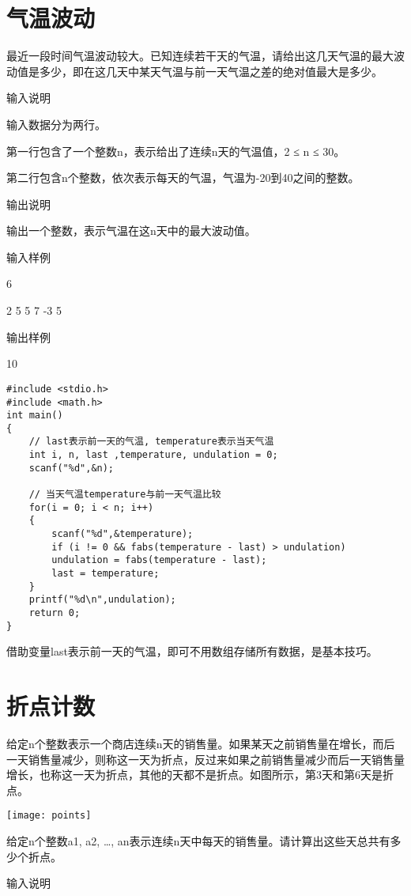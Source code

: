 \section{气温波动}	
最近一段时间气温波动较大。已知连续若干天的气温，请给出这几天气温的最大波动值是多少，即在这几天中某天气温与前一天气温之差的绝对值最大是多少。

输入说明	

输入数据分为两行。

第一行包含了一个整数n，表示给出了连续n天的气温值，2 ≤ n ≤ 30。

第二行包含n个整数，依次表示每天的气温，气温为-20到40之间的整数。

输出说明
	
输出一个整数，表示气温在这n天中的最大波动值。

输入样例	

6

2 5 5 7 -3 5

输出样例
	
10

\begin{lstlisting}
#include <stdio.h>
#include <math.h>
int main()
{
	// last表示前一天的气温, temperature表示当天气温
	int i, n, last ,temperature, undulation = 0;
	scanf("%d",&n);
	
	// 当天气温temperature与前一天气温比较
	for(i = 0; i < n; i++)
	{
		scanf("%d",&temperature);
		if (i != 0 && fabs(temperature - last) > undulation) 
		undulation = fabs(temperature - last);
		last = temperature;
	} 
	printf("%d\n",undulation); 
	return 0;
} 
\end{lstlisting}

\begin{note}
	借助变量last表示前一天的气温，即可不用数组存储所有数据，是基本技巧。
\end{note}
	

\section{折点计数}	
给定n个整数表示一个商店连续n天的销售量。如果某天之前销售量在增长，而后一天销售量减少，则称这一天为折点，反过来如果之前销售量减少而后一天销售量增长，也称这一天为折点，其他的天都不是折点。如图所示，第3天和第6天是折点。

\texttt{[image: points]}

给定n个整数a1, a2, \dots, an表示连续n天中每天的销售量。请计算出这些天总共有多少个折点。

输入说明
	
